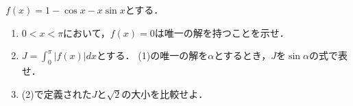 \documentclass[../../main.tex]{subfiles}
\begin{document}
$f(x)=1-\cos x-x\sin x$とする．
\begin{enumerate}
  \item $0<x<\pi$において，$f(x)=0$は唯一の解を持つことを示せ．
  \item $\displaystyle J=\int_0^\pi|f(x)|dx$とする．
    (1)の唯一の解を$\alpha$とするとき，$J$を$\sin\alpha$の式で表せ．
  \item (2)で定義された$J$と$\sqrt{2}$の大小を比較せよ．
\end{enumerate}
\end{document}
